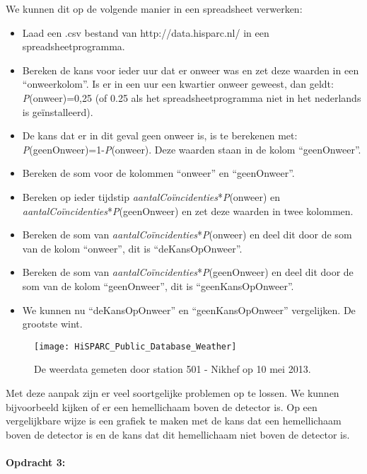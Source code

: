 We kunnen dit op de volgende manier in een spreadsheet verwerken:
\begin{itemize}
\item Laad een .csv bestand van http://data.hisparc.nl/ in een spreadsheetprogramma.
\item Bereken de kans voor ieder uur dat er onweer was en zet deze waarden
in een ``onweerkolom''. Is er in een uur een kwartier onweer geweest,
dan geldt: \emph{P}(onweer)=0,25 (of 0.25 als het spreadsheetprogramma
niet in het nederlands is geïnstalleerd). 
\item De kans dat er in dit geval geen onweer is, is te berekenen met: \emph{P}(geenOnweer)=1-\emph{P}(onweer).
Deze waarden staan in de kolom ``geenOnweer''.
\item Bereken de som voor de kolommen ``onweer'' en ``geenOnweer''.
\item Bereken op ieder tijdstip \emph{aantalCoïncidenties}{*}\emph{P}(onweer)
en \emph{aantalCoïncidenties}{*}\emph{P}(geenOnweer) en zet deze waarden
in twee kolommen.
\item Bereken de som van \emph{aantalCoïncidenties}{*}\emph{P}(onweer) en
deel dit door de som van de kolom ``onweer'', dit is ``deKansOpOnweer''. 
\item Bereken de som van \emph{aantalCoïncidenties}{*}\emph{P}(geenOnweer)
en deel dit door de som van de kolom ``geenOnweer'', dit is ``geenKansOpOnweer''. 
\item We kunnen nu ``deKansOpOnweer'' en ``geenKansOpOnweer'' vergelijken.
De grootste wint.
\end{itemize}
\begin{figure}[h]
\noindent \begin{centering}
\texttt{[image: HiSPARC\_Public\_Database\_Weather]}
\par\end{centering}

\caption{De weerdata gemeten door station 501 - Nikhef op 10 mei 2013.}
\end{figure}


Met deze aanpak zijn er veel soortgelijke problemen op te lossen.
We kunnen bijvoorbeeld kijken of er een hemellichaam boven de detector
is. Op een vergelijkbare wijze is een grafiek te maken met de kans
dat een hemellichaam boven de detector is en de kans dat dit hemellichaam
niet boven de detector is.


\paragraph*{Opdracht 3:}


